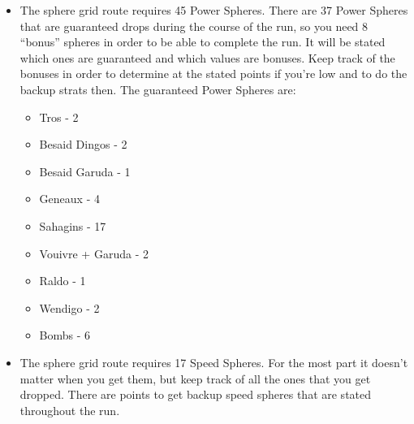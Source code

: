 \begin{itemize}
\item The sphere grid route requires 45 Power Spheres. There are 37 Power Spheres that are guaranteed drops during the course of the run, so you need 8 ``bonus'' spheres in order to be able to complete the run. It will be stated which ones are guaranteed and which values are bonuses. Keep track of the bonuses in order to determine at the stated points if you're low and to do the backup strats then. The guaranteed Power Spheres are:
\begin{itemize}
\item Tros - 2
\item Besaid Dingos - 2
\item Besaid Garuda - 1
\item Geneaux - 4
\item Sahagins - 17
\item Vouivre + Garuda - 2
\item Raldo - 1
\item Wendigo - 2
\item Bombs - 6
\end{itemize}
\item The sphere grid route requires 17 Speed Spheres. For the most part it doesn't matter when you get them, but keep track of all the ones that you get dropped. There are points to get backup speed spheres that are stated throughout the run.
\end{itemize}

\newpage